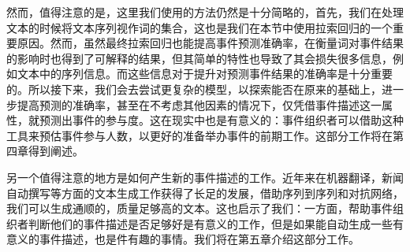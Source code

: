 \documentclass[12pt]{template}
\begin{document}
然而，值得注意的是，这里我们使用的方法仍然是十分简略的，首先，我们在处理文本的时候将文本序列视作词的集合，这也是我们在本节中使用拉索回归的一个重要原因。然而，虽然最终拉索回归也能提高事件预测准确率，在衡量词对事件结果的影响时也得到了可解释的结果，但其简单的特性也导致了其会损失很多信息，例如文本中的序列信息。而这些信息对于提升对预测事件结果的准确率是十分重要的。所以接下来，我们会去尝试更复杂的模型，以探索能否在原来的基础上，进一步提高预测的准确率，甚至在不考虑其他因素的情况下，仅凭借事件描述这一属性，就预测出事件的参与度。这在现实中也是有意义的：事件组织者可以借助这种工具来预估事件参与人数，以更好的准备举办事件的前期工作。这部分工作将在第四章得到阐述。

另一个值得注意的地方是如何产生新的事件描述的工作。近年来在机器翻译，新闻自动撰写等方面的文本生成工作获得了长足的发展，借助序列到序列和对抗网络，我们可以生成通顺的，质量足够高的文本。这也启示了我们：一方面，帮助事件组织者判断他们的事件描述是否足够好是有意义的工作，但是如果能自动生成一些有意义的事件描述，也是件有趣的事情。我们将在第五章介绍这部分工作。
\end{document}
